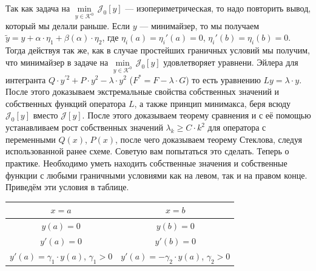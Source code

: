 \documentclass[12pt,a4paper,openany,fleqn]{book}
\newcommand{\J}{\ensuremath{\mathcal{J}}}
\newcommand{\mc}[1]{\ensuremath{\mathcal{#1}}}
\newcommand{\K}{\mc{K}}
\theoremstyle{definition}
\begin{document}
	Так как задача на $\displaystyle\min\limits_{y\in\K^0}\,\J_0[y]$ --- изопериметрическая, то надо повторить вывод, который мы делали раньше. Если $y$ --- минимайзер, то мы получаем $\tilde{y}=y+\alpha\cdot\eta_1+\beta(\alpha)\cdot\eta_2$, где $\eta_i(a)=\eta_i'(a)=0$, $\eta_i'(b)=\eta_i(b)=0$. Тогда действуя так же, как в случае простейших граничных условий мы получим, что минимайзер в задаче на $\displaystyle\min\limits_{y\in\K^0}\,\J_0[y]$ удовлетворяет уравнени. Эйлера для интегранта $Q\cdot y^{\prime2}+P\cdot y^2-\lambda\cdot y^2$ ($F^{\ast}=F-\lambda\cdot G$) то есть уравнению $Ly=\lambda\cdot y$. После этого доказываем экстремальные свойства собственных значений и собственных функций оператора $L$, а также принцип минимакса, беря всюду $\J_0[y]$ вместо $\J[y]$. После этого доказываем теорему сравнения и с её помощью устанавливаем рост собственных значений $\lambda_k\geqslant C\cdot k^2$ для оператора с переменными $Q(x)$, $P(x)$, после чего доказываем теорему Стеклова, следуя использованной ранее схеме. Советую вам попытаться это сделать. Теперь о практике. Необходимо уметь находить собственные значения и собственные функции с любыми граничными условиями как на левом, так и на правом конце. Приведём эти условия в таблице.
	\begin{center}
		\begin{tabular}{|c|c|}
			\hline
			$x=a$ & $x=b$ \\
			\hline
			$y(a)=0$ & $y(b)=0$ \\
			\hline
			$y'(a)=0$ & $y'(b)=0$ \\
			\hline
			$y'(a)=\gamma_1\cdot y(a)$, $\gamma_1>0$ & $y'(a)=-\gamma_2\cdot y(a)$, $\gamma_2>0$ \\
			\hline
		\end{tabular} 
	\end{center}
	
\end{document}
